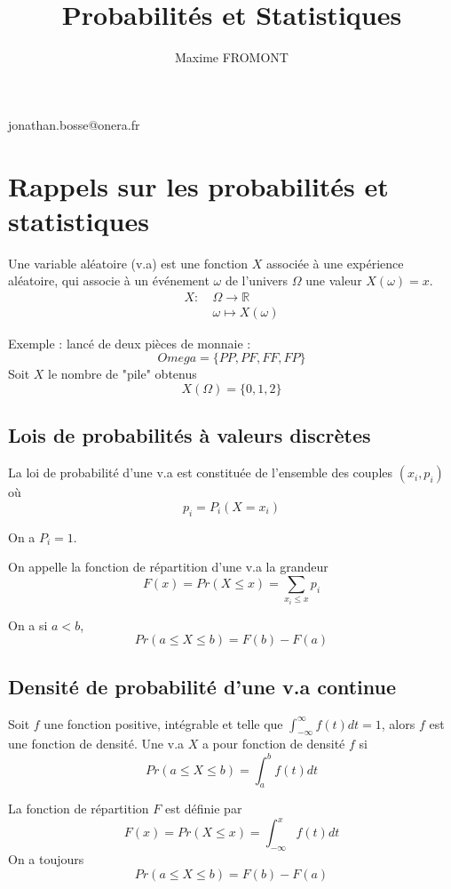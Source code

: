 \documentclass[11pt]{article}
\begin{document}
\title{Probabilités et Statistiques}
\author{Maxime FROMONT}
\maketitle

jonathan.bosse@onera.fr

\section{Rappels sur les probabilités et statistiques}

Une variable aléatoire (v.a) est une fonction $X$ associée à une expérience aléatoire, qui associe à un événement $\omega$ de l'univers $\Omega$ une valeur $X(\omega) = x$.
\begin{equation}
\begin{split}
X : \ & \Omega \longrightarrow \mathbb{R} \\
& \omega \longmapsto X(\omega)
\end{split}
\end{equation}

Exemple : lancé de deux pièces de monnaie :
\[Omega = \{PP, PF, FF, FP\}\]
Soit $X$ le nombre de "pile" obtenus
\[X(\Omega) = \{0, 1, 2\}\]

\subsection{Lois de probabilités à valeurs discrètes}

La loi de probabilité d'une v.a est constituée de l'ensemble des couples $(x_i, p_i)$ où \[p_i = P_i(X = x_i)\]

On a $P_i = 1$.

On appelle la fonction de répartition d'une v.a la grandeur 
\[F(x) = Pr(X \leqslant x) = \sum_{x_i \leqslant x} p_i\]

On a si $a < b$, \[Pr(a \leqslant X \leqslant b) = F(b) - F(a)\]

\subsection{Densité de probabilité d'une v.a continue}

Soit $f$ une fonction positive, intégrable et telle que $\int_{-\infty}^{\infty} f(t) dt = 1$, alors $f$ est une fonction de densité.
Une v.a $X$ a pour fonction de densité $f$ si
\[Pr(a \leqslant X \leqslant b) = \int_{a}^{b} f(t) dt\]

La fonction de répartition $F$ est définie par
\[F(x) = Pr(X \leqslant x) = \int_{-\infty}^{x} f(t) dt\]
On a toujours
\[Pr(a \leqslant X \leqslant b) = F(b) - F(a)\]
\end{document}

